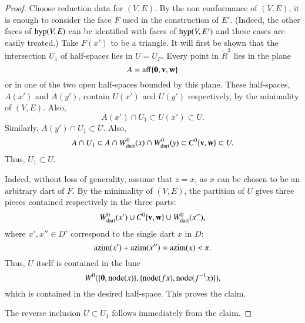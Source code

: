 \begin{proof}
Choose reduction data for $(V,E)$.  By the non conformance of
$(V,E)$, it is enough to consider the face $F$ used in the
construction of $E'$.  (Indeed, the other faces of ${\operatorname{hyp}}(V,E)$
can be identified with faces of ${\operatorname{hyp}}(V,E')$ and these cases are
easily treated.) Take $F(x')$ to be a triangle.  It will first be
shown that the intersection $U_1$ of half-spaces lies in $U=U_F$.
Every point in $\ring{R}^3$ lies in the plane
\begin{displaymath}
A={\operatorname{aff}}\{{\mathbf 0},{\mathbf v},{\mathbf w}\}
\end{displaymath}
or in one of the two open half-spaces bounded by this plane.  These
half-spaces, $A(x')$ and $A(y')$, contain $U(x')$ and $U(y')$
respectively, by the minimality of $(V,E)$.  Also,
\begin{displaymath}
A(x')\cap U_1 \subset U(x')\subset U.
\end{displaymath}
Similarly, $A(y')\cap U_1 \subset U$.  Also,
\begin{displaymath}
A \cap U_1 \subset A \cap W^0_{\text{dart}}(x) \cap W^0_{\text{dart}}(y) \subset C^0\{{\mathbf v},{\mathbf w}\} \subset U.
\end{displaymath}
Thus,
$U_1\subset U$.

 Indeed,
without loss of generality, assume that $z=x$, as $x$ can be chosen to
be an arbitrary dart of $F$.  By the minimality of $(V,E)$, the
partition  of $U$ gives three pieces contained respectively
in the three parts:
\begin{displaymath}
W^0_{\text{dart}}(x') \cup C^0\{{\mathbf v},{\mathbf w}\} \cup W^0_{\text{dart}}(x''),
\end{displaymath}
where $x',x''\in D'$ correspond to the single dart $x$ in $D$:
\begin{displaymath}
{\operatorname{azim}}(x') + {\operatorname{azim}}(x'') = {\operatorname{azim}}(x) < \pi.
\end{displaymath}
Thus, $U$ itself is contained in the lune
\begin{displaymath}
W^0(\{{\mathbf 0},{\operatorname{node}}(x)\},\{{\operatorname{node}}(f x),{\operatorname{node}}(f^{-1} x)\}),
\end{displaymath}
which is contained in the desired half-space.  This proves the claim.

The reverse inclusion $U\subset U_1$ follows immediately from the claim.
\end{proof}

%


